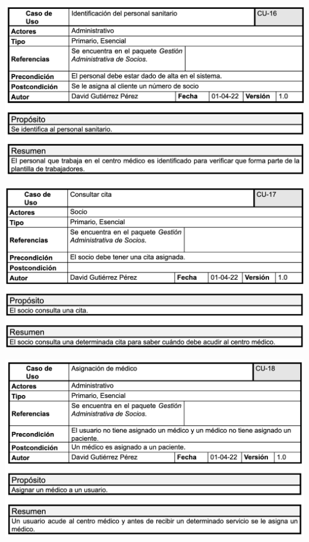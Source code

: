 \documentclass[12pt, spanish]{article}
\begin{document}
\begin{centering}\includegraphics[scale = 0.70]{casos_de_uso/16.png}\\[1.0 cm]\end{centering}
\begin{centering}\includegraphics[scale = 0.70]{casos_de_uso/17.png}\\[1.0 cm]\end{centering}
\begin{centering}\includegraphics[scale = 0.70]{casos_de_uso/18.png}\\[1.0 cm]\end{centering}
\end{document}
